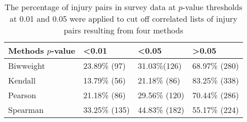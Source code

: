\begin{table}
\centering
\caption{The percentage of injury pairs in survey data at $p$-value thresholds at 0.01 and 0.05 were applied to cut off correlated lists of injury pairs resulting from four methods}
\label{table:injurypairs_percent}
\begin{tabular}{llll}
\hline
Methods $p$-value            & \textless 0.01 & \textless 0.05 & \textgreater 0.05 \\
\hline
Biwweight                  & 23.89\% (97)             & 31.03\%(126)             & 68.97\% (280)               \\
Kendall                    & 13.79\% (56)             & 21.18\% (86)             & 83.25\% (338)               \\
Pearson                    & 21.18\% (86)             & 29.56\% (120)            & 70.44\% (286)               \\
Spearman                   & 33.25\% (135)            & 44.83\% (182)            & 55.17\% (224)              \\
\hline
%
\end{tabular}
\end{table}

